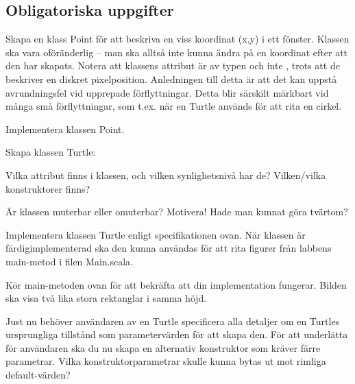 \clearpage

\subsection{Obligatoriska uppgifter}

\Task Skapa en klass Point för att beskriva en viss koordinat (x,y) i ett fönster. Klassen ska vara oföränderlig -- man ska alltså inte kunna ändra på en koordinat efter att den har skapats. Notera att klassens attribut är av typen  och inte , trots att de beskriver en diskret pixelposition. Anledningen till detta är att det kan uppstå avrundningsfel vid upprepade förflyttningar. Detta blir särskilt märkbart vid många små förflyttningar, som t.ex. när en Turtle används för att rita en cirkel.


\Subtask Implementera klassen Point.

\Task Skapa klassen Turtle:

\vspace{1em} %


\Subtask Vilka attribut finns i klassen, och vilken synlighetsnivå har de? Vilken/vilka konstruktorer finns? 

\Subtask Är klassen muterbar eller omuterbar? Motivera! Hade man kunnat göra tvärtom?

\Subtask Implementera klassen Turtle enligt specifikationen ovan. När klassen är färdigimplementerad ska den kunna användas för att rita figurer från labbens main-metod i filen Main.scala.


\Subtask Kör main-metoden ovan för att bekräfta att din implementation fungerar. Bilden ska visa två lika stora rektanglar i samma höjd.

\Subtask Just nu behöver användaren av en Turtle specificera alla detaljer om en Turtles ursprungliga tillstånd som parametervärden för att skapa den. För att underlätta för användaren ska du nu skapa en alternativ konstruktor som kräver färre parametrar. Vilka konstruktorparametrar skulle kunna bytas ut mot rimliga default-värden?


